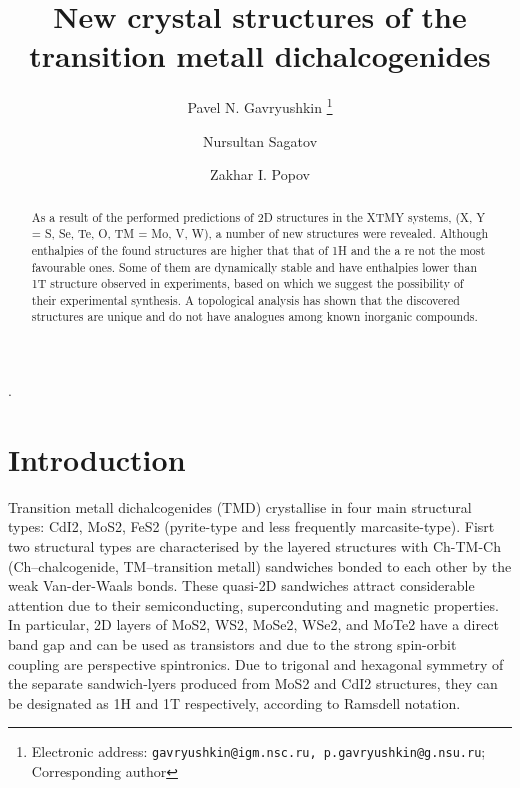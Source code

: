 .\documentclass[a4paperm]{article}
\begin{document}

\title{New crystal structures of the transition metall dichalcogenides}


\author[1,2]{Pavel N. Gavryushkin
   \thanks{Electronic address: \texttt{gavryushkin@igm.nsc.ru, p.gavryushkin@g.nsu.ru}; Corresponding author}}     
\author[1]{Nursultan Sagatov}
\author[3]{Zakhar I. Popov}


\date{}
\maketitle


\begin{abstract}

As a result of the performed predictions of 2D structures in the XTMY systems, (X, Y = S, Se, Te, O, TM = Mo, V, W), a number of new structures were revealed.
Although enthalpies of the found structures are higher that that of 1H and the a re not the most favourable ones.
Some of them are dynamically stable and have enthalpies lower than 1T structure observed in experiments, based on which we suggest the possibility of their experimental synthesis.
A topological analysis has shown that the discovered structures are unique and do not have analogues among known inorganic compounds. 
\end{abstract}

\section*{Introduction}
Transition metall dichalcogenides (TMD) crystallise in four main structural types: CdI2, MoS2, FeS2 (pyrite-type and less frequently marcasite-type).
Fisrt two structural types are characterised by the layered structures with Ch-TM-Ch (Ch--chalcogenide, TM--transition metall) sandwiches bonded to each other by the weak Van-der-Waals bonds. 
These quasi-2D sandwiches attract considerable attention due to their semiconducting, superconduting and magnetic properties.
In particular, 2D layers of MoS2, WS2, MoSe2, WSe2, and MoTe2 have a direct band gap and can be used as transistors and due to the strong spin-orbit coupling are perspective spintronics.
Due to trigonal and hexagonal symmetry of the separate sandwich-lyers produced from MoS2 and CdI2 structures, they can be designated as 1H and 1T respectively, according to Ramsdell notation.  
\end{document}
